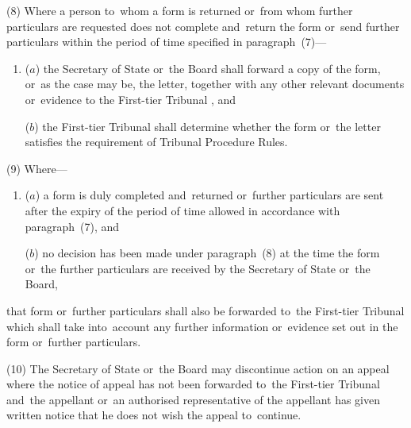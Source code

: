 \documentclass[12pt,a4paper]{article}
\begin{document}
(8) Where a person to~whom a form is returned or~from whom further particulars are requested does not complete and~return the form or~send further particulars within the period of time specified in paragraph~(7)—
\begin{enumerate}\item[]
($a$) the Secretary of State 
or~the Board   %
shall forward a copy of the form, or~as the case may be, the letter, together with any other relevant documents or~evidence to 
the First-tier Tribunal%
, and

($b$) the 
First-tier Tribunal  %
shall determine whether the form or~the letter satisfies the requirement of 
Tribunal Procedure Rules.  %
\end{enumerate}

(9) Where—
\begin{enumerate}\item[]
($a$) a form is duly completed and~returned or~further particulars are sent after the expiry of the period of time allowed in accordance with paragraph~(7), and

($b$) no decision has been made under paragraph~(8) at the time the form or~the further particulars are received by the Secretary of State
or~the Board,   %
\end{enumerate}
that form or~further particulars shall also be forwarded to~the 
First-tier Tribunal which  %
shall take into~account any further information or~evidence set out in the form or~further particulars.


(10) The Secretary of State or~the Board may discontinue action on an appeal where the
notice of  %
appeal has not been forwarded to~the 
First-tier Tribunal  %
and~the appellant or~an authorised representative of the appellant has given written notice that he does not wish the appeal to~continue.
\end{document}
